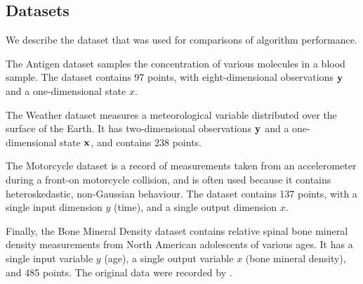 \documentclass[twoside]{article} \usepackage{aistats2017}
\theoremstyle{definition}
\theoremstyle{theorem}
\begin{document}
						
	\subsection{Datasets}
	\label{sec:experiments:datasets}
	
		We describe the dataset that was used for comparisons of algorithm performance.
		
		The Antigen dataset samples the concentration of various molecules \citep{quadrianto2009kernel} in a blood sample. The dataset contains 97 points, with eight-dimensional observations $\mathbf{y}$ and a one-dimensional state $x$.
		
		The Weather dataset measures a meteorological variable distributed over the surface of the Earth. It has two-dimensional observations $\mathbf{y}$ and a one-dimensional state $\mathbf{x}$, and contains 238 points.
		
		The Motorcycle dataset is a record of measurements taken from an accelerometer during a front-on motorcycle collision, and is often used because it contains heteroskedastic, non-Gaussian behaviour. The dataset contains 137 points, with a single input dimension $y$ (time), and a single output dimension $x$.
		
		Finally, the Bone Mineral Density dataset contains relative spinal bone mineral density measurements from North American adolescents of various ages. It has a single input variable $y$ (age), a single output variable $x$ (bone mineral density), and 485 points. The original data were recorded by \cite{bachrach1999bone}.
\end{document}
